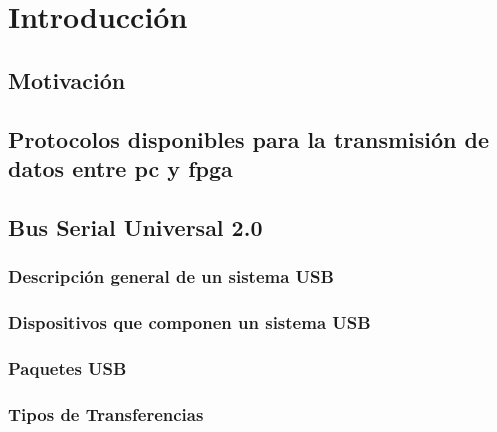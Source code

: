 \chapter{Introducción}
	\label{cap:int}
	
	\section{Motivación}
		\label{int:mot}
		
	\section{Protocolos disponibles para la transmisión de datos entre \acrshort{pc} y \acrshort{fpga}}
		\label{int:pro}
		
	\section{Bus Serial Universal 2.0}
		\label{cap:usb}
		
%			
		\subsection{Descripción general de un sistema USB}
			\label{usb:desc}
			
		\subsection{Dispositivos que componen un sistema USB}
			\label{usb:disp}
			
		\subsection{Paquetes USB}
			\label{usb:pkt}
			
		\subsection{Tipos de Transferencias}
			\label{usb:xfer}
			
